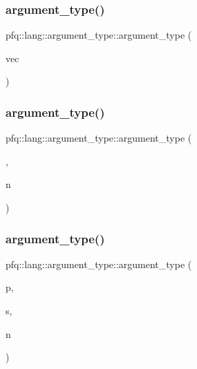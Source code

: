 \subsubsection{\texorpdfstring{argument\+\_\+type()}{argument\_type()}\hspace{0.1cm}{\footnotesize\ttfamily [7/10]}}
{\footnotesize\ttfamily pfq\+::lang\+::argument\+\_\+type\+::argument\+\_\+type (\begin{DoxyParamCaption}\item[{std\+::vector$<$ std\+::string $>$ const \&}]{vec }\end{DoxyParamCaption})\hspace{0.3cm}{\ttfamily [inline]}}

\mbox{\label{structpfq_1_1lang_1_1argument__type_a25b9c5fc803a86259615dd54e13a19e8}} 
\subsubsection{\texorpdfstring{argument\+\_\+type()}{argument\_type()}\hspace{0.1cm}{\footnotesize\ttfamily [8/10]}}
{\footnotesize\ttfamily pfq\+::lang\+::argument\+\_\+type\+::argument\+\_\+type (\begin{DoxyParamCaption}\item[{\hyperlink{structpfq_1_1lang_1_1funptr__t}{funptr\+\_\+t}}]{,  }\item[{std\+::size\+\_\+t}]{n }\end{DoxyParamCaption})\hspace{0.3cm}{\ttfamily [inline]}}

\mbox{\label{structpfq_1_1lang_1_1argument__type_a3586d8765421e7a9fc01ee5185be7f32}} 
\subsubsection{\texorpdfstring{argument\+\_\+type()}{argument\_type()}\hspace{0.1cm}{\footnotesize\ttfamily [9/10]}}
{\footnotesize\ttfamily pfq\+::lang\+::argument\+\_\+type\+::argument\+\_\+type (\begin{DoxyParamCaption}\item[{std\+::shared\+\_\+ptr$<$ Storable\+Show\+Base $>$}]{p,  }\item[{size\+\_\+t}]{s,  }\item[{size\+\_\+t}]{n }\end{DoxyParamCaption})\hspace{0.3cm}{\ttfamily [inline]}}


